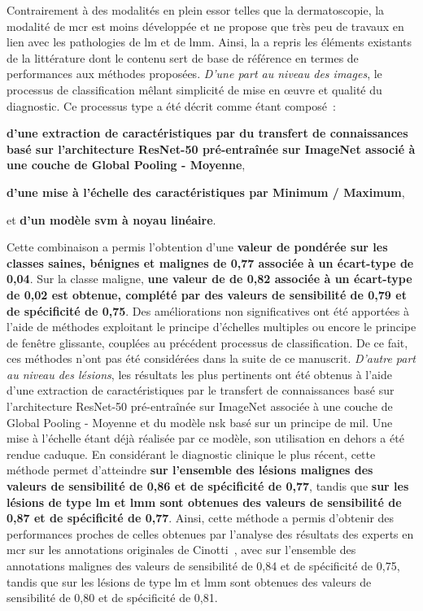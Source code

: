 Contrairement à des modalités en plein essor telles que la dermatoscopie, la modalité de \gls{mcr} est moins développée et ne propose que très peu de travaux en lien avec les pathologies de \gls{lm} et de \gls{lmm}. Ainsi, la  a repris les éléments existants de la littérature dont le contenu sert de base de référence en termes de performances aux méthodes proposées. \textit{D'une part au niveau des images}, le processus de classification mêlant simplicité de mise en œuvre et qualité du diagnostic. Ce processus type a été décrit comme étant composé~:
\begin{inlinerate}
    \item \textbf{d'une extraction de caractéristiques par du transfert de connaissances basé sur l'architecture ResNet-50 pré-entraînée sur ImageNet associé à une couche de Global Pooling - Moyenne},
    \item \textbf{d'une mise à l'échelle des caractéristiques par Minimum / Maximum},
    \item et \textbf{d'un modèle \gls{svm} à noyau linéaire}.
\end{inlinerate} Cette combinaison a permis l'obtention d'une \textbf{valeur de \fscore{} pondérée sur les classes saines, bénignes et malignes de 0,77 associée à un écart-type de 0,04}. Sur la classe maligne, \textbf{une valeur de \fscore{} de 0,82 associée à un écart-type de 0,02 est obtenue, complété par des valeurs de sensibilité de 0,79 et de spécificité de 0,75}. Des améliorations non significatives ont été apportées à l'aide de méthodes exploitant le principe d'échelles multiples ou encore le principe de fenêtre glissante, couplées au précédent processus de classification. De ce fait, ces méthodes n'ont pas été considérées dans la suite de ce manuscrit. \textit{D'autre part au niveau des lésions}, les résultats les plus pertinents ont été obtenus à l'aide d'une extraction de caractéristiques par le transfert de connaissances basé sur l'architecture ResNet-50 pré-entraînée sur ImageNet associée à une couche de Global Pooling - Moyenne et du modèle \gls{nsk} basé sur un principe de \gls{mil}. Une mise à l'échelle étant déjà réalisée par ce modèle, son utilisation en dehors a été rendue caduque. En considérant le diagnostic clinique le plus récent, cette méthode permet d'atteindre \textbf{sur l'ensemble des lésions malignes des valeurs de sensibilité de 0,86 et de spécificité de 0,77}, tandis que \textbf{sur les lésions de type \gls{lm} et \gls{lmm} sont obtenues des valeurs de sensibilité de 0,87 et de spécificité de 0,77}. Ainsi, cette méthode a permis d'obtenir des performances proches de celles obtenues par l'analyse des résultats des experts en \gls{mcr} sur les annotations originales de Cinotti~, avec sur l'ensemble des annotations malignes des valeurs de sensibilité de 0,84 et de spécificité de 0,75, tandis que sur les lésions de type \gls{lm} et \gls{lmm} sont obtenues des valeurs de sensibilité de 0,80 et de spécificité de 0,81.\par

